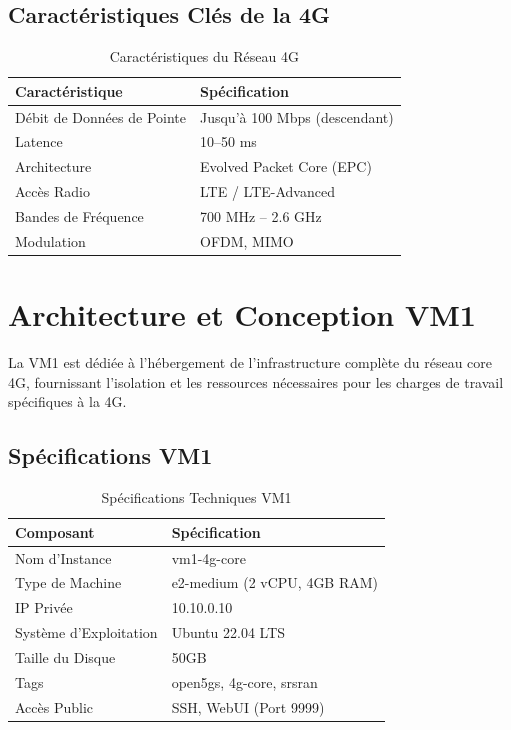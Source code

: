 \documentclass[12pt,a4paper]{report}
\begin{document}
\subsection{Caractéristiques Clés de la 4G}

\begin{table}[H]
\centering
\caption{Caractéristiques du Réseau 4G}
\label{tab:4g-characteristics}
\begin{tabular}{@{}ll@{}}
\toprule
Caractéristique & Spécification \\
\midrule
Débit de Données de Pointe & Jusqu'à 100 Mbps (descendant) \\
Latence & 10--50 ms \\
Architecture & Evolved Packet Core (EPC) \\
Accès Radio & LTE / LTE-Advanced \\
Bandes de Fréquence & 700 MHz -- 2.6 GHz \\
Modulation & OFDM, MIMO \\
\bottomrule
\end{tabular}
\end{table}

\section{Architecture et Conception VM1}

La VM1 est dédiée à l'hébergement de l'infrastructure complète du réseau core 4G, fournissant l'isolation et les ressources nécessaires pour les charges de travail spécifiques à la 4G.

\subsection{Spécifications VM1}

\begin{table}[H]
\centering
\caption{Spécifications Techniques VM1}
\label{tab:vm1-specs}
\begin{tabular}{@{}ll@{}}
\toprule
Composant & Spécification \\
\midrule
Nom d'Instance & vm1-4g-core \\
Type de Machine & e2-medium (2 vCPU, 4GB RAM) \\
IP Privée & 10.10.0.10 \\
Système d'Exploitation & Ubuntu 22.04 LTS \\
Taille du Disque & 50GB \\
Tags & open5gs, 4g-core, srsran \\
Accès Public & SSH, WebUI (Port 9999) \\
\bottomrule
\end{tabular}
\end{table}
\end{document}
